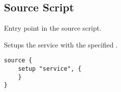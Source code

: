 \subsection{Source Script}



Entry point in the source script.


Setups the service with the specified .

\begin{lstlisting}[style=Java]
source {
    setup "service", {
    }
}
\end{lstlisting}


